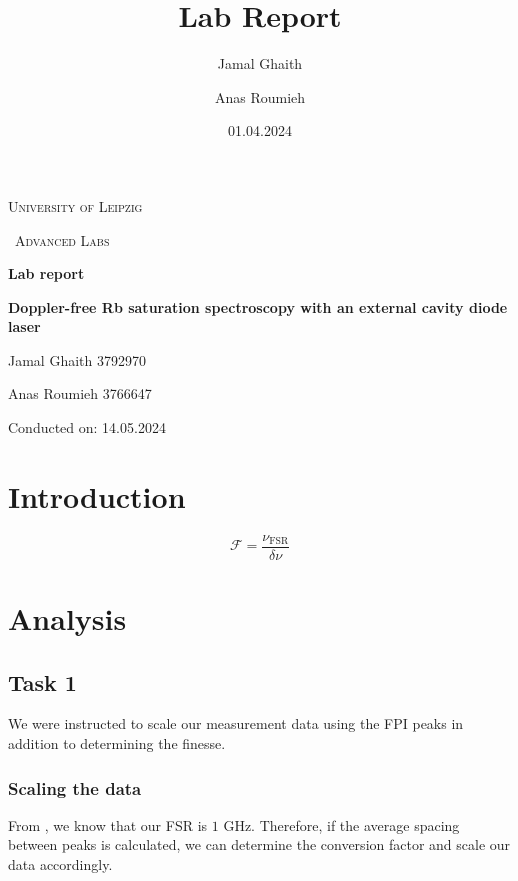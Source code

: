 \documentclass{article}
\title{Lab Report}
\author{Jamal Ghaith}
\author{Anas Roumieh}
\date{01.04.2024}
\begin{document}
\begin{titlepage}
	\centering
	{\scshape\LARGE University of Leipzig \par}
	\vspace{1cm}
	{\scshape\ Advanced Labs\par}
	\vspace{1.5cm}
	{\huge\bfseries Lab report\par}
	\vspace{2cm}
	{\huge\bfseries Doppler-free Rb saturation spectroscopy with an external cavity diode laser\par}
	\vspace{2cm}
	{\Large Jamal Ghaith 3792970\par}
    {\Large Anas Roumieh 3766647\par}
	\vfill

    {\Large Conducted on:  14.05.2024\par}
	\vfill
\end{titlepage}

\tableofcontents
{}
\pagebreak{}

\section{Introduction}

\begin{equation}
	\mathscr{F} = \frac{\nu_{\text{FSR}}}{\delta \nu}
	\label{eq:finesse}
\end{equation}

\pagebreak{}

\section{Analysis}

\subsection{Task 1}

We were instructed to scale our measurement data using the FPI peaks in addition to determining the finesse.

\subsubsection{Scaling the data}

From \cite{jung_2018_dopplerfree}, we know that our FSR is $1$ GHz. Therefore, if the average spacing between peaks is calculated, we can determine the conversion factor and scale our data accordingly.
\end{document}
